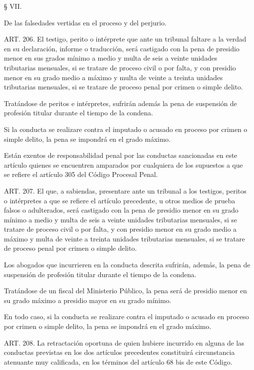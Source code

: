     § VII.

    De las falsedades vertidas en el proceso y del perjurio.




    ART. 206.
    El testigo, perito o intérprete que ante un tribunal faltare a la verdad en su declaración, informe o traducción, será castigado con la pena de presidio menor en sus grados mínimo a medio y multa de seis a veinte unidades tributarias mensuales, si se tratare de proceso civil o por falta, y con presidio menor en su grado medio a máximo y multa de veinte a treinta unidades tributarias mensuales, si se tratare de proceso penal por crimen o simple delito.

    Tratándose de peritos e intérpretes, sufrirán además la pena de suspensión de profesión titular durante el tiempo de la condena.

    Si la conducta se realizare contra el imputado o acusado en proceso por crimen o simple delito, la pena se impondrá en el grado máximo.

    Están exentos de responsabilidad penal por las conductas sancionadas en este artículo quienes se encuentren amparados por cualquiera de los supuestos a que se refiere el artículo 305 del Código Procesal Penal.


    ART. 207.
    El que, a sabiendas, presentare ante un tribunal a los testigos, peritos o intérpretes a que se refiere el artículo precedente, u otros medios de prueba falsos o adulterados, será castigado con la pena de presidio menor en su grado mínimo a medio y multa de seis a veinte unidades tributarias mensuales, si se tratare de proceso civil o por falta, y con presidio menor en su grado medio a máximo y multa de veinte a treinta unidades tributarias mensuales, si se tratare de proceso penal por crimen o simple delito.

    Los abogados que incurrieren en la conducta descrita sufrirán, además, la pena de suspensión de profesión titular durante el tiempo de la condena.

    Tratándose de un fiscal del Ministerio Público, la pena será de presidio menor en su grado máximo a presidio mayor en su grado mínimo.

    En todo caso, si la conducta se realizare contra el imputado o acusado en proceso por crimen o simple delito, la pena se impondrá en el grado máximo.


    ART. 208.
    La retractación oportuna de quien hubiere incurrido en alguna de las conductas previstas en los dos artículos precedentes constituirá circunstancia atenuante muy calificada, en los términos del artículo 68 bis de este Código.

